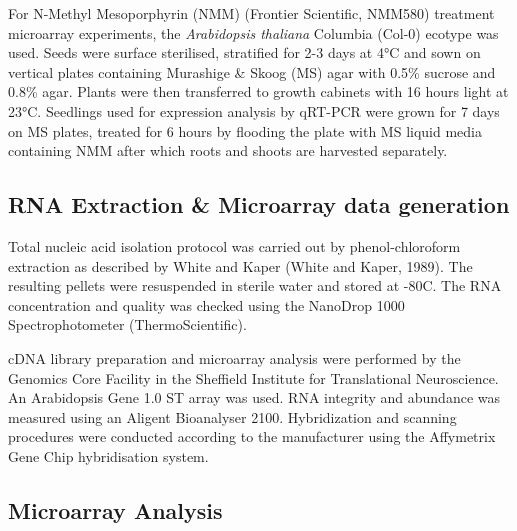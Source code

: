\documentclass[12pt,a4paper,]{report}
\begin{document}
For N-Methyl Mesoporphyrin (NMM) (Frontier Scientific, NMM580) treatment
microarray experiments, the \emph{Arabidopsis thaliana} Columbia (Col-0)
ecotype was used. Seeds were surface sterilised, stratified for 2-3 days
at 4°C and sown on vertical plates containing Murashige \& Skoog (MS)
agar with 0.5\% sucrose and 0.8\% agar. Plants were then transferred to
growth cabinets with 16 hours light at 23°C. Seedlings used for
expression analysis by qRT-PCR were grown for 7 days on MS plates,
treated for 6 hours by flooding the plate with MS liquid media
containing NMM after which roots and shoots are harvested separately.

\hypertarget{rna-extraction-microarray-data-generation}{%
\subsection{RNA Extraction \& Microarray data
generation}\label{rna-extraction-microarray-data-generation}}

Total nucleic acid isolation protocol was carried out by
phenol-chloroform extraction as described by White and Kaper (White and
Kaper, 1989). The resulting pellets were resuspended in sterile water
and stored at -80C. The RNA concentration and quality was checked using
the NanoDrop 1000 Spectrophotometer (ThermoScientific).

cDNA library preparation and microarray analysis were performed by the
Genomics Core Facility in the Sheffield Institute for Translational
Neuroscience. An Arabidopsis Gene 1.0 ST array was used. RNA integrity
and abundance was measured using an Aligent Bioanalyser 2100.
Hybridization and scanning procedures were conducted according to the
manufacturer using the Affymetrix Gene Chip hybridisation system.

\hypertarget{microarray-analysis}{%
\subsection{Microarray Analysis}\label{microarray-analysis}}
\end{document}
